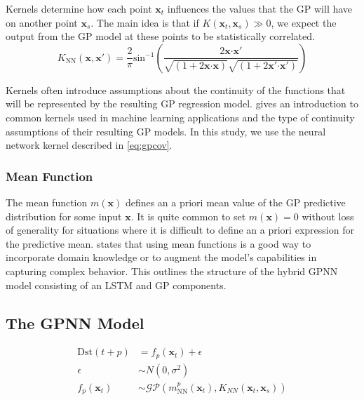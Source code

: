 Kernels determine how each point $\mathbf{x}_t$ influences the values that the GP will have on another point 
$\mathbf{x}_s$. The main idea is that if $K(\mathbf{x}_t, \mathbf{x}_s) \gg 0$, we expect the output from the 
GP model at these points to be statistically correlated. 
%
\begin{equation}\label{eq:gpcov}
	K_{\text{NN}} \left( \mathbf{x}, \mathbf{x}' \right) = 
	\frac{2}{ \pi } \text{sin}^{-1} \left( \frac{2\mathbf{x}\boldsymbol{\cdot}\mathbf{x}'}{
		\sqrt{ \left( 1+2\mathbf{x}\boldsymbol{\cdot} \mathbf{x} \right)}\sqrt{\left( 1+2\mathbf{x}'\boldsymbol{\cdot}\mathbf{x}' \right)}
		} \right)
\end{equation}


Kernels often introduce assumptions about the continuity of the functions that will be 
represented by the resulting GP regression model. \citet[ch.~4]{Rasmussen:2005:GPM:1162254} gives an 
introduction to common kernels used in machine learning applications and the type of continuity assumptions 
of their resulting GP models. In this study, we use the neural network kernel \citep{williams1998computation} 
described in \cref{eq:gpcov}. 

\subsubsection*{Mean Function}

The mean function $m \left( \mathbf{x} \right)$ defines an a priori mean value of the GP predictive distribution for 
some input $\mathbf{x}$. It is quite common to set $m(\mathbf{x}) = 0$ without loss of generality for situations where 
it is difficult to define an a priori expression for the predictive mean. 
\citet[ch.~2,sec.~2.7]{Rasmussen:2005:GPM:1162254} states that using mean functions is a good way to incorporate 
domain knowledge or to augment the model's capabilities in capturing complex behavior. This outlines the structure 
of the hybrid GPNN model consisting of an LSTM and GP components. 

\subsection{The GPNN Model}

\begin{align}
	\mathrm{Dst} \left( t+p \right) &= f_{p} \left( \mathbf{x}_{t} \right) + \epsilon \label{eq:dstgpnn}\\ 
	\epsilon &\sim N \left( 0, \sigma ^{2} \right)  \label{eq:gpnnNoise}\\
	f_{p} \left( \mathbf{x}_{t} \right)  &\sim 
	\mathcal{GP}\left(m^{p}_{\text{NN}}(\mathbf{x}_t), K_{NN}(\mathbf{x}_{t},\mathbf{x}_{s})\right)\label{eq:gpnnGPForm}
\end{align}
	
